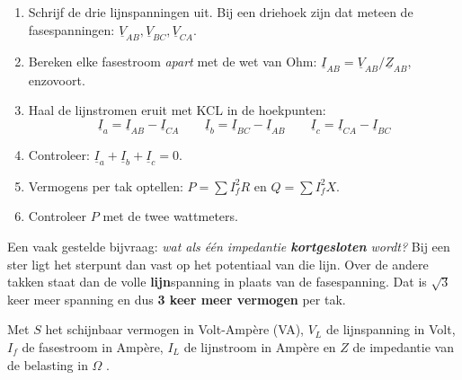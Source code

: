 \documentclass[a4paper,11pt]{article}
\begin{document}
\begin{theorie}
    \begin{enumerate}
        \item Schrijf de drie lijnspanningen uit. Bij een driehoek zijn dat meteen de
              fasespanningen: $\underline{V}_{AB}, \underline{V}_{BC}, \underline{V}_{CA}$.
        \item Bereken elke fasestroom \emph{apart} met de wet van Ohm:
              $\underline{I}_{AB} = \underline{V}_{AB}/\underline{Z}_{AB}$, enzovoort.
        \item Haal de lijnstromen eruit met KCL in de hoekpunten:
              \[\underline{I}_a = \underline{I}_{AB} - \underline{I}_{CA} \qquad
                  \underline{I}_b = \underline{I}_{BC} - \underline{I}_{AB} \qquad
                  \underline{I}_c = \underline{I}_{CA} - \underline{I}_{BC}\]
        \item Controleer: $\underline{I}_a + \underline{I}_b + \underline{I}_c = 0$.
        \item Vermogens per tak optellen: $P = \sum I_f^2 R$ en $Q = \sum I_f^2 X$.
        \item Controleer $P$ met de twee wattmeters.
    \end{enumerate}
\end{theorie}

\begin{examenbox}
    Een vaak gestelde bijvraag: \textit{wat als één impedantie \textbf{kortgesloten} wordt?}
    Bij een ster ligt het sterpunt dan vast op het potentiaal van die lijn. Over de andere takken
    staat dan de volle \textbf{lijn}spanning in plaats van de fasespanning. Dat is
    $\sqrt{3}$ keer meer spanning en dus \textbf{3 keer meer vermogen} per tak.
\end{examenbox}

{Met $S$ het schijnbaar vermogen in Volt-Ampère (VA), $V_L$ de lijnspanning in Volt,
    $I_f$ de fasestroom in Ampère, $I_L$ de lijnstroom in Ampère en $Z$ de impedantie van de belasting in $\Omega$ .}
\end{document}
